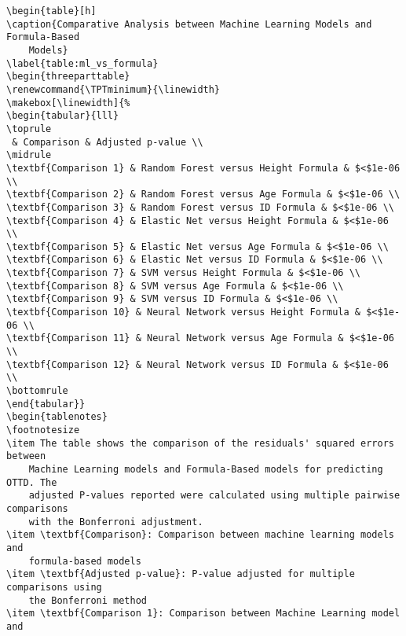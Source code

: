 \documentclass[11pt]{article}
\begin{document}
\begin{Verbatim}[tabsize=4]
\begin{table}[h]
\caption{Comparative Analysis between Machine Learning Models and Formula-Based
	Models}
\label{table:ml_vs_formula}
\begin{threeparttable}
\renewcommand{\TPTminimum}{\linewidth}
\makebox[\linewidth]{%
\begin{tabular}{lll}
\toprule
 & Comparison & Adjusted p-value \\
\midrule
\textbf{Comparison 1} & Random Forest versus Height Formula & $<$1e-06 \\
\textbf{Comparison 2} & Random Forest versus Age Formula & $<$1e-06 \\
\textbf{Comparison 3} & Random Forest versus ID Formula & $<$1e-06 \\
\textbf{Comparison 4} & Elastic Net versus Height Formula & $<$1e-06 \\
\textbf{Comparison 5} & Elastic Net versus Age Formula & $<$1e-06 \\
\textbf{Comparison 6} & Elastic Net versus ID Formula & $<$1e-06 \\
\textbf{Comparison 7} & SVM versus Height Formula & $<$1e-06 \\
\textbf{Comparison 8} & SVM versus Age Formula & $<$1e-06 \\
\textbf{Comparison 9} & SVM versus ID Formula & $<$1e-06 \\
\textbf{Comparison 10} & Neural Network versus Height Formula & $<$1e-06 \\
\textbf{Comparison 11} & Neural Network versus Age Formula & $<$1e-06 \\
\textbf{Comparison 12} & Neural Network versus ID Formula & $<$1e-06 \\
\bottomrule
\end{tabular}}
\begin{tablenotes}
\footnotesize
\item The table shows the comparison of the residuals' squared errors between
	Machine Learning models and Formula-Based models for predicting OTTD. The
	adjusted P-values reported were calculated using multiple pairwise comparisons
	with the Bonferroni adjustment.
\item \textbf{Comparison}: Comparison between machine learning models and
	formula-based models
\item \textbf{Adjusted p-value}: P-value adjusted for multiple comparisons using
	the Bonferroni method
\item \textbf{Comparison 1}: Comparison between Machine Learning model and

\end{Verbatim}
\end{document}
